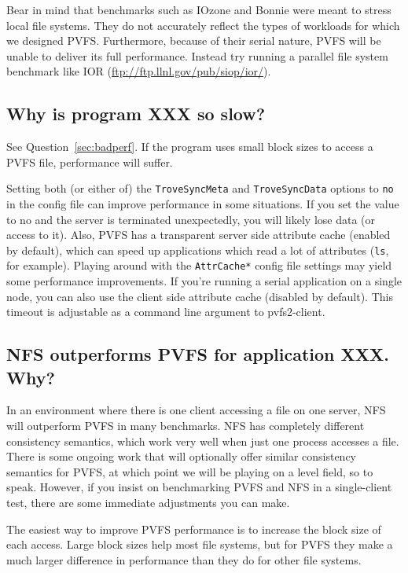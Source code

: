 \documentclass[11pt,letterpaper]{article}
\begin{document}
Bear in mind that benchmarks such as IOzone and Bonnie were meant to
stress local file systems.   They do not accurately reflect the types of
workloads for which we designed PVFS.  Furthermore, because of their
serial nature, PVFS will be unable to deliver its full performance.
Instead try running a parallel file system benchmark like IOR
(\url{ftp://ftp.llnl.gov/pub/siop/ior/}).


\subsection{Why is program XXX so slow?}
\label{sec:why_so_slow}
See Question~\ref{sec:badperf}.  If the program uses small block sizes to
access a PVFS file, performance will suffer.  

Setting both (or either of) the \texttt{TroveSyncMeta} and
\texttt{TroveSyncData} options to \texttt{no} in the config file can
improve performance in some situations.  If you set the
value to no and the server is terminated unexpectedly, you will likely
lose data (or access to it).  Also, PVFS has a transparent server
side attribute cache (enabled by default), which can speed up
applications which read a lot of attributes (\texttt{ls}, for
example).  Playing around with the \texttt{AttrCache*} config file
settings may yield some performance improvements.  If you're running a
serial application on a single node, you can also use the client side
attribute cache (disabled by default).  This timeout is adjustable as
a command line argument to pvfs2-client.

\subsection{NFS outperforms PVFS for application XXX. Why?}
\label{sec:nfs_vs_pvfs2}

In an environment where there is one client accessing a file on one
server, NFS will outperform PVFS in many benchmarks.  NFS has
completely different consistency semantics, which work very well when
just one process accesses a file.  There is some ongoing work that
will optionally offer similar consistency semantics for PVFS, at
which point we will be playing on a level field, so to speak.
However, if you insist on benchmarking PVFS and NFS in a
single-client test, there are some immediate adjustments you can make.

The easiest way to improve PVFS performance is to increase the block
size of each access.  Large block sizes help most file systems, but
for PVFS they make a much larger difference in performance than they
do for other file systems.
\end{document}
